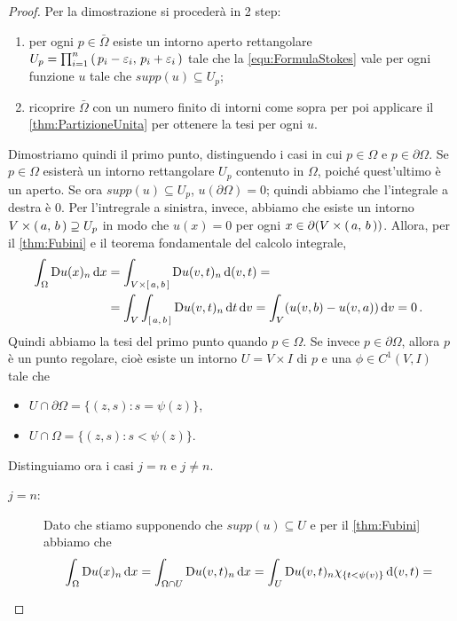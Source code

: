 \begin{proof}
	Per la dimostrazione si procederà in 2 step:
	\begin{enumerate}
		\item per ogni $p\in \bar \Omega$ esiste un intorno aperto rettangolare $U_p=\prod_{i=1}^n \left(\,p_i-\varepsilon_i,\,p_i+\varepsilon_i\,\right)$
			tale che la \cref{equ:FormulaStokes} vale per ogni funzione $u$ tale che $supp(u)\subseteq U_p$;
		\item ricoprire $\bar \Omega$ con un numero finito di intorni come sopra per poi applicare il \cref{thm:PartizioneUnita} per ottenere
			la tesi per ogni $u$.
	\end{enumerate}
	
	Dimostriamo quindi il primo punto, distinguendo i casi in cui $p\in \Omega$ e $p\in \partial \Omega$.
	Se $p\in \Omega$ esisterà un intorno rettangolare $U_p$ contenuto in $\Omega$, poiché quest'ultimo è un aperto. Se ora $supp(u)\subseteq U_p$,
	$u(\partial \Omega)=0$; quindi abbiamo che l'integrale a destra è $0$. Per l'intregrale a sinistra, invece, abbiamo che esiste un intorno
	$V\times \left(\,a,\,b\,\right) \supseteq U_p$ in modo che $u(x)=0$ per ogni $x\in \partial (V\times \left(\,a,\,b\,\right))$. Allora, per il \cref{thm:Fubini} e il
	teorema fondamentale del calcolo integrale,
	\begin{align*}
		\int_{\Omega} \mathrm D u(x)_n \,\mathrm d x &= \int_{V\times \left[\,a,\,b\,\right]} \mathrm D u(v,t)_n \,\mathrm d (v,t) = \\
		& = \int_V \int_{\left[\,a,\,b\,\right]} \mathrm D u(v,t)_n \,\mathrm d t \,\mathrm d v = \int_V (u(v,b) - u(v,a)) \,\mathrm d v = 0\, \text{. }
	\end{align*}
	Quindi abbiamo la tesi del primo punto quando $p\in\Omega$. Se invece $p\in \partial \Omega$, allora $p$ è un punto regolare, cioè esiste
	un intorno $U=V\times I$ di $p$ e una $\phi\in C^1(V,I)$ tale che
	\begin{itemize}
		\item $U\cap \partial \Omega = \{(z,s):s=\psi(z)\}$,
		\item $U\cap \Omega = \{(z,s):s<\psi(z)\}$.
	\end{itemize}
	Distinguiamo ora i casi $j=n$ e $j\neq n$.
	\begin{description}
		\item [$j=n$:] Dato che stiamo supponendo che $supp(u)\subseteq U$ e per il \cref{thm:Fubini} abbiamo che
			\begin{align*}
				\int_{\Omega} \Diff u(x)_n \de x  &= \int_{\Omega\cap U} \Diff u(v,t)_n\de x =
				\int_{U} \Diff u(v,t)_n \chi_{\{t<\psi(v)\}} \de (v,t) = \\

\end{align*}
\end{description}
\end{proof}
